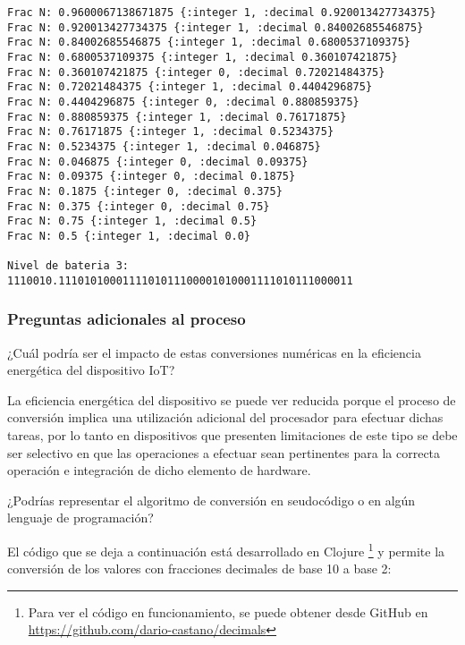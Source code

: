\documentclass[stu, 12pt, letterpaper, donotrepeattitle, floatsintext, natbib]{apa7}
\begin{document}
\begin{verbatim}
Frac N: 0.9600067138671875 {:integer 1, :decimal 0.920013427734375}
Frac N: 0.920013427734375 {:integer 1, :decimal 0.84002685546875}
Frac N: 0.84002685546875 {:integer 1, :decimal 0.6800537109375}
Frac N: 0.6800537109375 {:integer 1, :decimal 0.360107421875}
Frac N: 0.360107421875 {:integer 0, :decimal 0.72021484375}
Frac N: 0.72021484375 {:integer 1, :decimal 0.4404296875}
Frac N: 0.4404296875 {:integer 0, :decimal 0.880859375}
Frac N: 0.880859375 {:integer 1, :decimal 0.76171875}
Frac N: 0.76171875 {:integer 1, :decimal 0.5234375}
Frac N: 0.5234375 {:integer 1, :decimal 0.046875}
Frac N: 0.046875 {:integer 0, :decimal 0.09375}
Frac N: 0.09375 {:integer 0, :decimal 0.1875}
Frac N: 0.1875 {:integer 0, :decimal 0.375}
Frac N: 0.375 {:integer 0, :decimal 0.75}
Frac N: 0.75 {:integer 1, :decimal 0.5}
Frac N: 0.5 {:integer 1, :decimal 0.0}

Nivel de bateria 3: 1110010.1110101000111101011100001010001111010111000011

\end{verbatim}


\subsubsection{Preguntas adicionales al proceso}
¿Cuál podría ser el impacto de estas conversiones numéricas en la eficiencia energética del dispositivo IoT?

La eficiencia energética del dispositivo se puede ver reducida porque el proceso de conversión implica una utilización adicional del procesador para efectuar dichas tareas, por lo tanto en dispositivos que presenten limitaciones de este tipo se debe ser selectivo en que las operaciones a efectuar sean pertinentes para la correcta operación e integración de dicho elemento de hardware.

¿Podrías representar el algoritmo de conversión en seudocódigo o en algún lenguaje de programación?

El código que se deja a continuación está desarrollado en Clojure \footnote{Para ver el código en funcionamiento, se puede obtener desde GitHub en \url{https://github.com/dario-castano/decimals}} y permite la conversión de los valores con fracciones decimales de base 10 a base 2:
\end{document}
